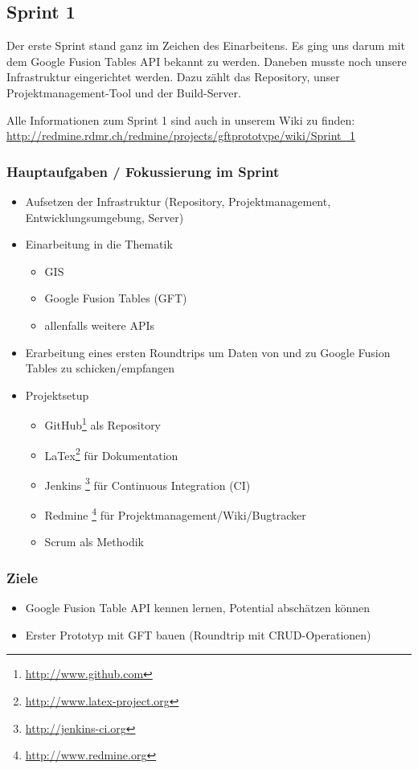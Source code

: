 \subsection{Sprint 1}

Der erste Sprint stand ganz im Zeichen des Einarbeitens. Es ging uns darum mit dem Google Fusion Tables \gls{API} bekannt zu werden. Daneben musste noch unsere Infrastruktur eingerichtet werden. Dazu zählt das Repository, unser Projektmanagement-Tool und der Build-Server.

Alle Informationen zum Sprint 1 sind auch in unserem Wiki zu finden:
\url{http://redmine.rdmr.ch/redmine/projects/gftprototype/wiki/Sprint_1}

\subsubsection{Hauptaufgaben / Fokussierung im Sprint}

\begin{itemize}
	\item Aufsetzen der Infrastruktur (Repository, Projektmanagement, Entwicklungsumgebung, Server)
	\item Einarbeitung in die Thematik
	\begin{itemize}
		\item \gls{GIS}
		\item Google Fusion Tables (GFT)
		\item allenfalls weitere \gls{API}s
	\end{itemize}
	\item Erarbeitung eines ersten Roundtrips um Daten von und zu Google Fusion Tables zu schicken/empfangen
	\item Projektsetup
	\begin{itemize}
		\item GitHub\footnote{\url{http://www.github.com}} als Repository
		\item LaTex\footnote{\url{http://www.latex-project.org}} für Dokumentation
		\item Jenkins \footnote{\url{http://jenkins-ci.org}} für Continuous Integration (CI)
		\item Redmine \footnote{\url{http://www.redmine.org}} für Projektmanagement/Wiki/Bugtracker
		\item Scrum als Methodik
	\end{itemize}
\end{itemize}

\subsubsection{Ziele}
\begin{itemize}
	\item Google Fusion Table \gls{API} kennen lernen, Potential abschätzen können
	\item Erster Prototyp mit GFT bauen (Roundtrip mit CRUD-Operationen)
\end{itemize}

